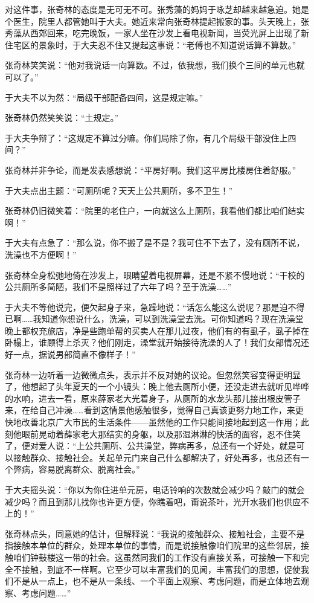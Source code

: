 \par 对这件事，张奇林的态度是无可无不可。张秀藻的妈妈于咏芝却越来越急迫。她是个医生，院里人都管她叫于大夫。她近来常向张奇林提起搬家的事。头天晚上，张秀藻从西郊回来，吃完晚饭，一家人坐在沙发上看电视新闻，当荧光屏上出现了新住宅区的景象时，于大夫忍不住又提起这事说：“老傅也不知道说话算不算数。”
\par 张奇林笑笑说：“他对我说话一向算数。不过，依我想，我们换个三间的单元也就可以了。”
\par 于大夫不以为然：“局级干部配备四间，这是规定嘛。”
\par 张奇林仍然笑笑说：“土规定。”
\par 于大夫争辩了：“这规定不算过分嘛。你们局除了你，有几个局级干部没住上四间？”
\par 张奇林并非争论，而是发表感想说：“平房好啊。我们这平房比楼房住着舒服。”
\par 于大夫点出主题：“可厕所呢？天天上公共厕所，多不卫生！”
\par 张奇林仍旧微笑着：“院里的老住户，一向就这么上厕所，我看他们都比咱们结实啊！”
\par 于大夫有点急了：“那么说，你不搬了是不是？我可住不下去了，没有厕所不说，洗澡也不方便啊！”
\par 张奇林全身松弛地倚在沙发上，眼睛望着电视屏幕，还是不紧不慢地说：“干校的公共厕所多简陋，我们不是照样过了六年了吗？至于洗澡……”
\par 于大夫不等他说完，便欠起身子来，急躁地说：“话怎么能这么说呢？那是迫不得已啊……我知道你想说什么，洗澡，可以到洗澡堂去洗。可你知道吗？现在洗澡堂晚上都权充旅店，净是些跑单帮的买卖人在那儿过夜，他们有的有虱子，虱子掉在卧榻上，谁顾得上杀灭？他们刚走，澡堂就开始接待洗澡的人了！我们女部情况还好一点，据说男部简直不像样子！”
\par 张奇林一边听着一边微微点头，表示并不反对她的议论。但忽然笑容变得更明显了，他想起了头年夏天的一个小镜头：晚上他去厕所小便，还没走进去就听见哗哗的水响，进去一看，原来薛家老大光着身子，从厕所的水龙头那儿接出根皮管子来，在给自己冲澡……看到这情景他感触很多，觉得自己真该更努力地工作，来更快地改善北京广大市民的生活条件——虽然他的工作只能间接地起到这一作用；此刻他眼前晃动着薛家老大那结实的身躯，以及那湿淋淋的快活的面容，忍不住笑了，便对爱人说：“上公共厕所、公共澡堂，弊病再多，总还有一个好处，就是可以接触群众、接触社会。关起单元门来自己什么都解决了，好处再多，也总还有一个弊病，容易脱离群众、脱离社会。”
\par 于大夫摇头说：“你以为你住进单元房，电话铃响的次数就会减少吗？敲门的就会减少吗？而且到那儿找你也许更方便，你瞧着吧，甭说茶叶，光开水我们也供应不上的！”
\par 张奇林点头，同意她的估计，但解释说：“我说的接触群众、接触社会，主要不是指接触本单位的群众，处理本单位的事情，而是说接触像咱们院里的这些邻居，接触咱们钟鼓楼这一带的社会。这虽然同我们的工作没有直接关系，可接触一下和完全不接触，到底不一样啊。它至少可以丰富我们的见闻，丰富我们的思想，促使我们不是从一点上，也不是从一条线、一个平面上观察、考虑问题，而是立体地去观察、考虑问题……”

